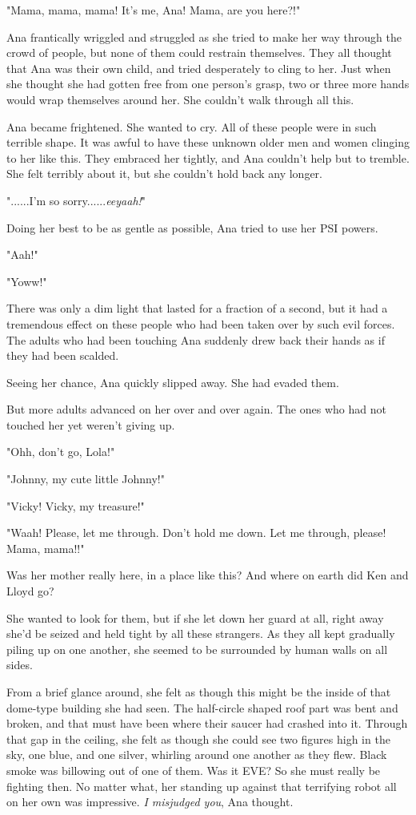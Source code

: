 \documentclass[
]{article}
\begin{document}
"Mama, mama, mama! It's me, Ana! Mama, are you here?!"

Ana frantically wriggled and struggled as she tried to make her way
through the crowd of people, but none of them could restrain themselves.
They all thought that Ana was their own child, and tried desperately to
cling to her. Just when she thought she had gotten free from one
person's grasp, two or three more hands would wrap themselves around
her. She couldn't walk through all this.

Ana became frightened. She wanted to cry. All of these people were in
such terrible shape. It was awful to have these unknown older men and
women clinging to her like this. They embraced her tightly, and Ana
couldn't help but to tremble. She felt terribly about it, but she
couldn't hold back any longer.

"......I'm so sorry......\emph{eeyaah!}"

Doing her best to be as gentle as possible, Ana tried to use her PSI
powers.

"Aah!"

"Yoww!"

There was only a dim light that lasted for a fraction of a second, but
it had a tremendous effect on these people who had been taken over by
such evil forces. The adults who had been touching Ana suddenly drew
back their hands as if they had been scalded.

Seeing her chance, Ana quickly slipped away. She had evaded them.

But more adults advanced on her over and over again. The ones who had
not touched her yet weren't giving up.

"Ohh, don't go, Lola!"

"Johnny, my cute little Johnny!"

"Vicky! Vicky, my treasure!"

"Waah! Please, let me through. Don't hold me down. Let me through,
please! Mama, mama!!"

Was her mother really here, in a place like this? And where on earth did
Ken and Lloyd go?

She wanted to look for them, but if she let down her guard at all, right
away she'd be seized and held tight by all these strangers. As they all
kept gradually piling up on one another, she seemed to be surrounded by
human walls on all sides.

From a brief glance around, she felt as though this might be the inside
of that dome-type building she had seen. The half-circle shaped roof
part was bent and broken, and that must have been where their saucer had
crashed into it. Through that gap in the ceiling, she felt as though she
could see two figures high in the sky, one blue, and one silver,
whirling around one another as they flew. Black smoke was billowing out
of one of them. Was it EVE? So she must really be fighting then. No
matter what, her standing up against that terrifying robot all on her
own was impressive. \emph{I misjudged you}, Ana thought.
\end{document}
